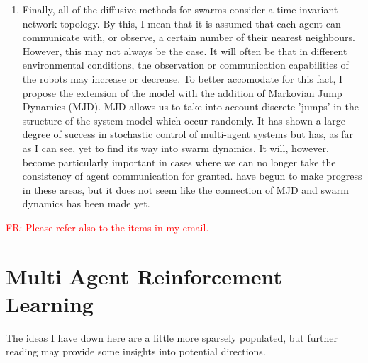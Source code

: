 \documentclass[preprint,11pt]{report}
\newcommand\fr[1]{\textcolor{red}{FR: #1}}
\begin{document}
\begin{enumerate}
\item Finally, all of the diffusive methods for swarms consider a time invariant network topology.
By this, I mean that it is assumed that each agent can communicate with, or observe, a certain
number of their nearest neighbours. However, this may not always be the case. It will often be that
in different environmental conditions, the observation or communication capabilities of the robots
may increase or decrease. To better accomodate for this fact, I propose the extension of the model
with the addition of Markovian Jump Dynamics (MJD). MJD allows us to take into account discrete
'jumps' in the structure of the system model which occur randomly. It has shown a large degree of
success in stochastic control of multi-agent systems but has, as far as I can see, yet to find its
way into swarm dynamics. It will, however, become particularly important in cases where we can no
longer take the consistency of agent communication for granted. 
\cite{FUHRMANFrancescoRUSSO,Ma2017,Li2017} have begun to make progress in these areas, but it does
not seem like the connection of MJD and swarm dynamics has been made yet.
\end{enumerate}

\fr{Please refer also to the items in my email.}

\section{Multi Agent Reinforcement Learning}

The ideas I have down here are a little more sparsely populated, but further reading may provide
some insights into potential directions.
\end{document}
